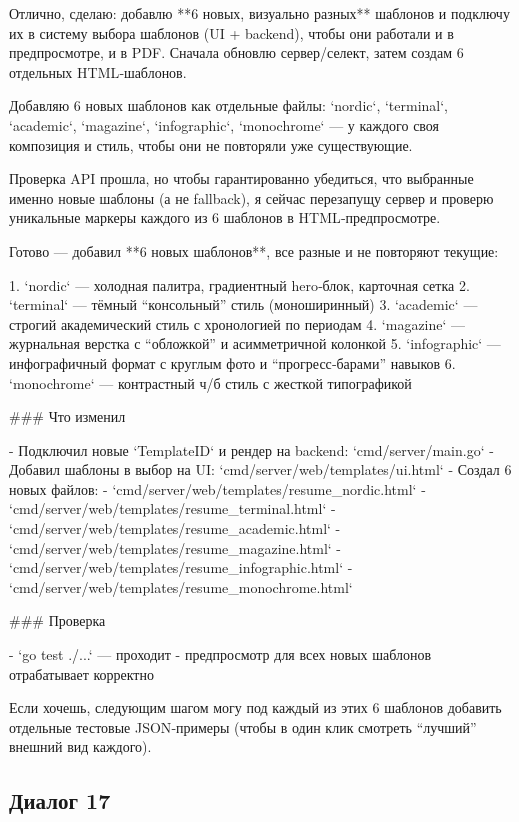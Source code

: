 \documentclass[a4paper, 14pt]{extarticle} %
\begin{document}
\begin{AnswerBlock}

Отлично, сделаю: добавлю **6 новых, визуально разных** шаблонов и подключу их в систему выбора шаблонов (UI + backend), чтобы они работали и в предпросмотре, и в PDF. Сначала обновлю сервер/селект, затем создам 6 отдельных HTML‑шаблонов.

Добавляю 6 новых шаблонов как отдельные файлы: `nordic`, `terminal`, `academic`, `magazine`, `infographic`, `monochrome` — у каждого своя композиция и стиль, чтобы они не повторяли уже существующие.

Проверка API прошла, но чтобы гарантированно убедиться, что выбранные именно новые шаблоны (а не fallback), я сейчас перезапущу сервер и проверю уникальные маркеры каждого из 6 шаблонов в HTML‑предпросмотре.

Готово — добавил **6 новых шаблонов**, все разные и не повторяют текущие:

1. `nordic` — холодная палитра, градиентный hero‑блок, карточная сетка  
2. `terminal` — тёмный “консольный” стиль (моноширинный)  
3. `academic` — строгий академический стиль с хронологией по периодам  
4. `magazine` — журнальная верстка с “обложкой” и асимметричной колонкой  
5. `infographic` — инфографичный формат с круглым фото и “прогресс‑барами” навыков  
6. `monochrome` — контрастный ч/б стиль с жесткой типографикой  

### Что изменил

- Подключил новые `TemplateID` и рендер на backend: `cmd/server/main.go`
- Добавил шаблоны в выбор на UI: `cmd/server/web/templates/ui.html`
- Создал 6 новых файлов:
  - `cmd/server/web/templates/resume_nordic.html`
  - `cmd/server/web/templates/resume_terminal.html`
  - `cmd/server/web/templates/resume_academic.html`
  - `cmd/server/web/templates/resume_magazine.html`
  - `cmd/server/web/templates/resume_infographic.html`
  - `cmd/server/web/templates/resume_monochrome.html`

### Проверка

- `go test ./...` — проходит
- предпросмотр для всех новых шаблонов отрабатывает корректно

Если хочешь, следующим шагом могу под каждый из этих 6 шаблонов добавить отдельные тестовые JSON‑примеры (чтобы в один клик смотреть “лучший” внешний вид каждого).

\end{AnswerBlock}

\subsection*{Диалог 17}
\end{document}
